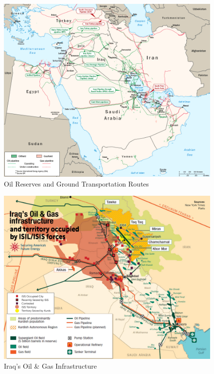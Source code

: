 \documentclass{report}
\begin{document}



\begin{figure}[H]
 \centering
 \includegraphics[trim = 0cm 0cm 0cm 0cm, clip,scale=0.3]{./figures/oil_reserves.png}
   \caption{Oil Reserves and Ground Transportation Routes \cite{PoliticalCalculations2012}}
     \label{fig:oil_reserves}
\end{figure}



\begin{figure}[H]
 \centering
 \includegraphics[trim = 0cm 0cm 0cm 0cm, clip,scale=0.3]{./figures/oil_infrastructure.jpg}
   \caption{Iraq's Oil \& Gas Infrastructure \cite{EnergyPolicyInformationCenter2014}}
     \label{fig:oil_infrastructure}
\end{figure}
\end{document}
